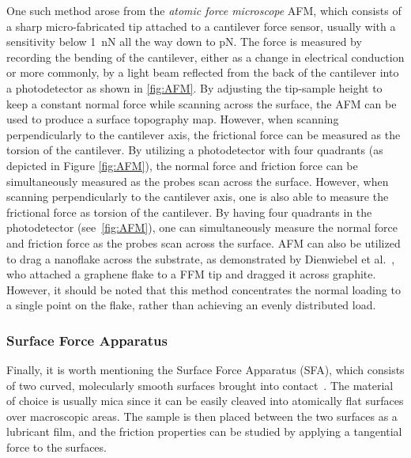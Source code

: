 One such method arose from the \textit{atomic force microscope} \acrshort{AFM}, which consists of a sharp micro-fabricated tip attached to a cantilever force sensor, usually with a sensitivity below \SI{1}{nN} all the way down to pN. The force is measured by recording the bending of
the cantilever, either as a change in electrical conduction or more commonly, by
a light beam reflected from the back of the cantilever into a photodetector
\cite[p. 183]{gnecco_meyer_2015} as shown in \cref{fig:AFM}. By adjusting the tip-sample height to keep a constant normal force while scanning across the surface, the \acrshort{AFM} can be used to produce a
surface topography map.  However, when scanning perpendicularly to the cantilever axis, the frictional force can be measured as the torsion of the cantilever. By utilizing a photodetector with four quadrants (as depicted in Figure \ref{fig:AFM}), the normal force and friction force can be simultaneously measured as the probes scan across the surface. However, when scanning
perpendicularly to the cantilever axis, one is also able to measure the
frictional force as torsion of the cantilever. By having four quadrants in the
photodetector (see~\cref{fig:AFM}), one can simultaneously
measure the normal force and friction force as the probes scan across the
surface. \acrshort{AFM} can also be utilized to drag a nanoflake across the substrate, as demonstrated by Dienwiebel et al.~\cite{DIENWIEBEL2005197}, who attached a graphene flake to a \acrshort{FFM} tip and dragged it across graphite. However, it should be noted that this method concentrates the normal loading to a single point on the flake, rather than achieving an evenly distributed load.


\subsubsection{Surface Force Apparatus}
Finally, it is worth mentioning the Surface Force Apparatus (\acrshort{SFA}), which consists of two curved, molecularly smooth surfaces brought into contact~\cite[p. 188]{gnecco_meyer_2015}. The material of choice is usually mica since it can be easily cleaved into atomically flat surfaces over macroscopic areas. The sample is then placed between the two surfaces as a lubricant film, and the friction properties can be studied by applying a tangential force to the surfaces.

